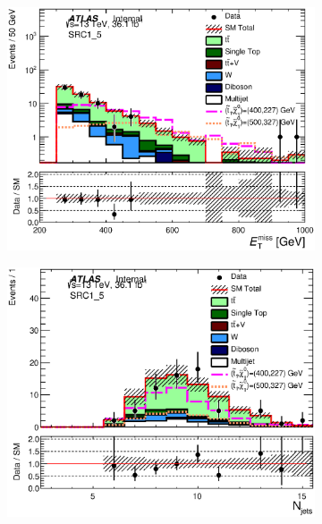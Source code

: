 \begin{figure}[h!]
  \begin{center}
      \begin{subfigure}[b]{0.40\textwidth}    
    	 \includegraphics[width=\textwidth]{figures/plotRegion/Met_SRC1_5_log.eps}
                \caption{ }
    \end{subfigure}
        \begin{subfigure}[b]{0.40\textwidth}    
    	 \includegraphics[width=\textwidth]{figures/plotRegion/NJets_SRC1_5.eps}
                \caption{ }
    \end{subfigure}

\end{center}
\end{figure}
